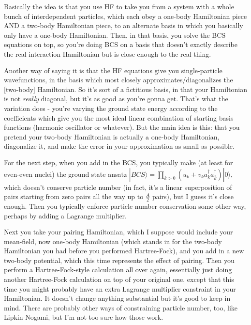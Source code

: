 Basically the idea is that you use HF to take you from a system with a whole bunch of interdependent particles, which each obey a one-body Hamiltonian piece AND a two-body Hamiltonian piece, to an alternate basis in which you basically only have a one-body Hamiltonian. Then, in that basis, you solve the BCS equations on top, so you're doing BCS on a basis that doesn't exactly describe the real interaction Hamiltonian but is close enough to the real thing.

Another way of saying it is that the HF equations give you single-particle wavefunctions, in the basis which most closely approximates/diagonalizes the [two-body] Hamiltonian. So it's sort of a fictitious basis, in that your Hamiltonian is not \textit{really} diagonal, but it's as good as you're gonna get. That's what the variation does - you're varying the ground state energy according to the coefficients which give you the most ideal linear combination of starting basis functions (harmonic oscillator or whatever). But the main idea is this: that you pretend your two-body Hamiltonian is actually a one-body Hamiltonian, diagonalize it, and make the error in your approximation as small as possible.

For the next step, when you add in the BCS, you typically make (at least for even-even nuclei) the ground state ansatz $|BCS\rangle = \prod_{k>0}(u_k+v_k a_k^\dagger a_{\bar{k}}^\dagger)|0\rangle$, which doesn't conserve particle number (in fact, it's a linear superposition of pairs starting from zero pairs all the way up to $\frac{A}{2}$ pairs), but I guess it's close enough. Then you typically enforce particle number conservation some other way, perhaps by adding a Lagrange multiplier.

Next you take your pairing Hamiltonian, which I suppose would include your mean-field, now one-body Hamiltonian (which stands in for the two-body Hamiltonian you had before you performed Hartree-Fock), and you add in a new two-body potential, which this time represents the effect of pairing. Then you perform a Hartree-Fock-style calculation all over again, essentially just doing another Hartree-Fock calculation on top of your original one, except that this time you might probably have an extra Lagrange multiplier constraint in your Hamiltonian. It doesn't change anything substantial but it's good to keep in mind. There are probably other ways of constraining particle number, too, like Lipkin-Nogami, but I'm not too sure how those work.


